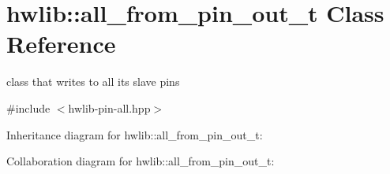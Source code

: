 \hypertarget{classhwlib_1_1all__from__pin__out__t}{}\section{hwlib\+:\+:all\+\_\+from\+\_\+pin\+\_\+out\+\_\+t Class Reference}
\label{classhwlib_1_1all__from__pin__out__t}


class that writes to all its slave pins  




{\ttfamily \#include $<$hwlib-\/pin-\/all.\+hpp$>$}



Inheritance diagram for hwlib\+:\+:all\+\_\+from\+\_\+pin\+\_\+out\+\_\+t\+:


Collaboration diagram for hwlib\+:\+:all\+\_\+from\+\_\+pin\+\_\+out\+\_\+t\+:
